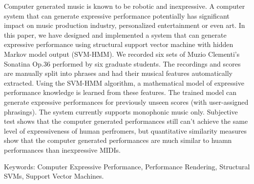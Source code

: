\begin{abstractEN}

Computer generated music is known to be robotic and inexpressive. A computer system that can generate expressive performance potentially has significant impact on music production industry, personalized entertainment or even art. In this paper, we have designed and implemented a system that can generate expressive performance using structural support vector machine with hidden Markov model output (SVM-HMM). We recorded six sets of Muzio Clementi's Sonatina Op.36 performed by six graduate students. The recordings and scores are manually split into phrases and had their musical features automatically extracted. Using the SVM-HMM algorithm, a mathematical model of expressive performance knowledge is learned from these features. The trained model can generate expressive performances for previously unseen scores (with user-assigned phrasings). The system currently supports monophonic music only. Subjective test shows that the computer generated performances still can't achieve the same level of expressiveness of human perfromers, but quantitative similarity measures show that the computer generated performances are much similar to huamn performances than inexpressive MIDIs.

Keywords: Computer Expressive Performance, Performance Rendering, Structural SVMs, Support Vector Machines.
\end{abstractEN}
